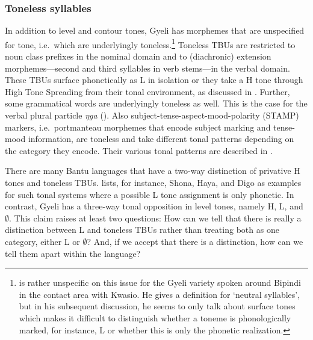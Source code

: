 
\subsubsection{Toneless syllables}
\label{sec:toneless}


In addition to level and contour tones,  Gyeli has morphemes that are unspecified for tone, i.e.\ which are underlyingly toneless.\footnote{\citet{renaud76} is rather unspecific on this issue for the Gyeli variety spoken around Bipindi in the contact area with Kwasio. He gives a definition for `neutral syllables', but in his subsequent discussion, he seems to only talk about surface tones which makes it difficult to distinguish whether a toneme is phonologically marked, for instance, L or whether this is only the phonetic realization.} Toneless TBUs are restricted to noun class prefixes in the nominal domain and to (diachronic) extension morphemes---second and third syllables in verb stems---in the verbal domain. These TBUs surface phonetically as L in isolation or they take a H tone through High Tone Spreading from their tonal environment, as discussed in . Further, some grammatical words are underlyingly toneless as well. This is the case for the verbal plural particle {\itshape ŋga} (). Also subject-tense-aspect-mood-polarity (STAMP) markers, i.e.\ portmanteau morphemes that encode subject marking and tense-mood information, are toneless and take different tonal patterns depending on the category they encode. Their various tonal patterns are described in .


There are many Bantu languages that have a two-way distinction of privative H tones and toneless TBUs. \citet[239]{hyman2001} lists, for instance, Shona, Haya, and Digo as examples for such tonal systems where a possible L tone assignment is only phonetic. In contrast, Gyeli has a three-way tonal opposition in level tones, namely H, L, and $\emptyset$. This claim raises at least two questions: How can we tell that there is really a distinction between L and toneless TBUs rather than treating both as one category, either L or $\emptyset$? And, if we accept that there is a distinction, how can we tell them apart within the language?

